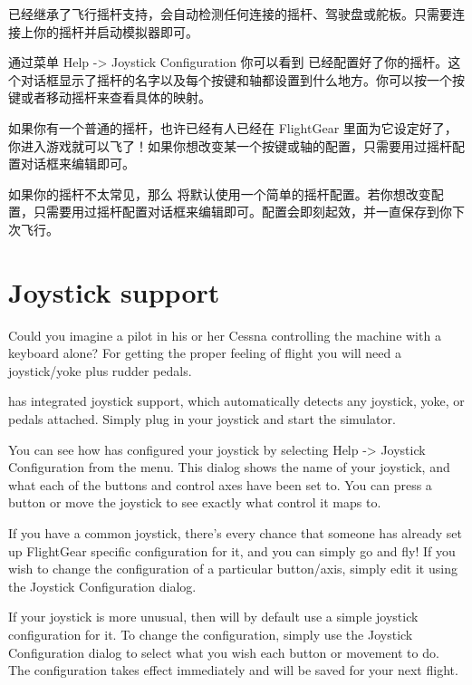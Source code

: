 \begin{itemize}
{\FlightGear{} 已经继承了飞行摇杆支持，会自动检测任何连接的摇杆、驾驶盘或舵板。只需要连接上你的摇杆并启动模拟器即可。

通过菜单 Help -> Joystick Configuration 你可以看到 \FlightGear{} 已经配置好了你的摇杆。这个对话框显示了摇杆的名字以及每个按键和轴都设置到什么地方。你可以按一个按键或者移动摇杆来查看具体的映射。

如果你有一个普通的摇杆，也许已经有人已经在 FlightGear 里面为它设定好了，你进入游戏就可以飞了！如果你想改变某一个按键或轴的配置，只需要用过摇杆配置对话框来编辑即可。

如果你的摇杆不太常见，那么 \FlightGear{} 将默认使用一个简单的摇杆配置。若你想改变配置，只需要用过摇杆配置对话框来编辑即可。配置会即刻起效，并一直保存到你下次飞行。
}
\fi
\iffalse
{
  \section{Joystick support\label{joysticksupp}}
  Could you imagine a pilot in his or her Cessna controlling the machine with
  a keyboard alone? For getting the proper feeling of flight you will need a
  joystick/yoke plus rudder pedals.

  \FlightGear{} has integrated joystick support, which automatically detects
  any joystick, yoke, or pedals attached. Simply plug in your joystick and start
  the simulator.

  You can see how \FlightGear{} has configured your joystick by selecting
  Help -> Joystick Configuration from the menu.  This dialog shows the name
  of your joystick, and what each of the buttons and control axes have been set to.
  You can press a button or move the joystick to see exactly what control it maps to.

  If you have a common joystick, there's every chance that someone has already
  set up FlightGear specific configuration for it, and you can simply go and fly!
  If you wish to change the configuration of a particular button/axis, simply edit
  it using the Joystick Configuration dialog.

  If your joystick is more unusual, then \FlightGear{} will by default use a simple
  joystick configuration for it.  To change the configuration, simply use the Joystick
  Configuration dialog to select what you wish each button or movement to do.  The
  configuration takes effect immediately and will be saved for your next flight.

}
\end{itemize}
